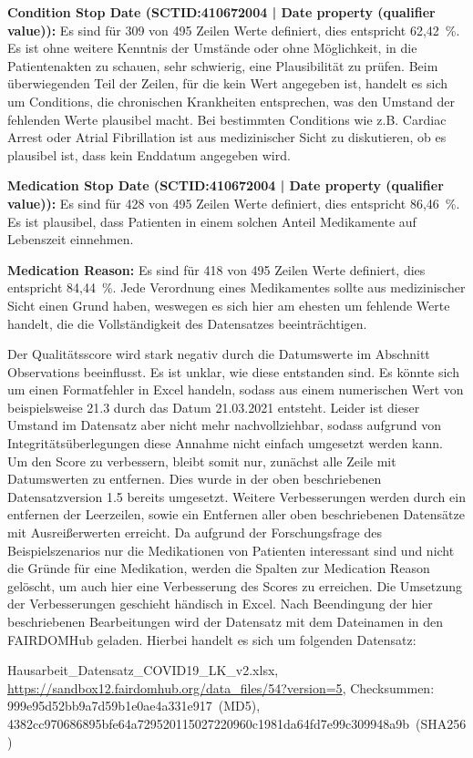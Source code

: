 \documentclass[12pt,a4paper,toc=bibliographynumbered,toc=indenttextentries]{scrreprt}
\begin{document}
\begin{description}
			\textbf{Condition Stop Date (SCTID:410672004 | Date property (qualifier value)):} Es sind für 309 von 495 Zeilen Werte definiert, dies entspricht 62,42~\%. Es ist ohne weitere Kenntnis der Umstände oder ohne Möglichkeit, in die Patientenakten zu schauen, sehr schwierig, eine Plausibilität zu prüfen. Beim überwiegenden Teil der Zeilen, für die kein Wert angegeben ist, handelt es sich um Conditions, die chronischen Krankheiten entsprechen, was den Umstand der fehlenden Werte plausibel macht. Bei bestimmten Conditions wie z.B. Cardiac Arrest oder Atrial Fibrillation ist aus medizinischer Sicht zu diskutieren, ob es plausibel ist, dass kein Enddatum angegeben wird.\par
			\textbf{Medication Stop Date (SCTID:410672004 | Date property (qualifier value)):} Es sind für 428 von 495 Zeilen Werte definiert, dies entspricht 86,46~\%. Es ist plausibel, dass Patienten in einem solchen Anteil Medikamente auf Lebenszeit einnehmen.\par
			\textbf{Medication Reason:} Es sind für 418 von 495 Zeilen Werte definiert, dies entspricht 84,44~\%. Jede Verordnung eines Medikamentes sollte aus medizinischer Sicht einen Grund haben, weswegen es sich hier am ehesten um fehlende Werte handelt, die die Vollständigkeit des Datensatzes beeinträchtigen.
		\end{description}
		Der Qualitätsscore wird stark negativ durch die Datumswerte im Abschnitt Observations beeinflusst. Es ist unklar, wie diese entstanden sind. Es könnte sich um einen Formatfehler in Excel handeln, sodass aus einem numerischen Wert von beispielsweise 21.3 durch das Datum 21.03.2021 entsteht. Leider ist dieser Umstand im Datensatz aber nicht mehr nachvollziehbar, sodass aufgrund von Integritätsüberlegungen diese Annahme nicht einfach umgesetzt werden kann. Um den Score zu verbessern, bleibt somit nur, zunächst alle Zeile mit Datumswerten zu entfernen. Dies wurde in der oben beschriebenen Datensatzversion 1.5 bereits umgesetzt. Weitere Verbesserungen werden durch ein entfernen der Leerzeilen, sowie ein Entfernen aller oben beschriebenen Datensätze mit Ausreißerwerten erreicht. Da aufgrund der Forschungsfrage des Beispielszenarios nur die Medikationen von Patienten interessant sind und nicht die Gründe für eine Medikation, werden die Spalten zur Medication Reason gelöscht, um auch hier eine Verbesserung des Scores zu erreichen. Die Umsetzung der Verbesserungen geschieht händisch in Excel.
		Nach Beendingung der hier beschriebenen Bearbeitungen wird der Datensatz mit dem Dateinamen in den FAIRDOMHub geladen. Hierbei handelt es sich um folgenden Datensatz:\par
		\textsf{Hausarbeit\_Datensatz\_COVID19\_LK\_v2.xlsx,  \url{https://sandbox12.fairdomhub.org/data_files/54?version=5}, Checksummen: 999e95d52bb9a7d59b1e0ae4a331e917~(MD5), 4382cc970686895bfe64a729520115027220960c1981da64fd7e99c309948a9b~(SHA256)}
	
\end{document}
